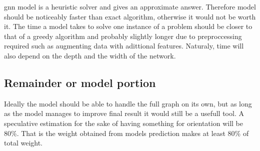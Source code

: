 \gls{gnn} model is a heuristic solver and gives an approximate answer. Therefore model should be noticeably faster than exact algorithm, otherwise it would not be worth it. The time a model takes to solve one instance of a problem should be closer to that of a greedy algorithm and probably slightly longer due to preproccessing required such as augmenting data with adittional features. Naturaly, time will also depend on the depth and the width of the network.

\subsection{Remainder or model portion}

Ideally the model should be able to handle the full graph on its own, but as long as the model manages to improve final result it would still be a usefull tool. A speculative estimation for the sake of having something for orientation will be 80\%. That is the weight obtained from models prediction makes at least 80\% of total weight.